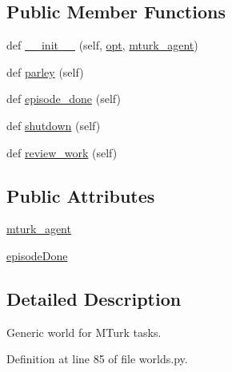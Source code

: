 \subsection*{Public Member Functions}
\begin{DoxyCompactItemize}
\item 
def \hyperlink{classparlai_1_1mturk_1_1core_1_1worlds_1_1MTurkTaskWorld_a7aee41b0411b618882dbad31b8c6209a}{\+\_\+\+\_\+init\+\_\+\+\_\+} (self, \hyperlink{classparlai_1_1core_1_1worlds_1_1World_a3640d92718acd3e6942a28c1ab3678bd}{opt}, \hyperlink{classparlai_1_1mturk_1_1core_1_1worlds_1_1MTurkTaskWorld_ae9fb1250e0b9a2f77efa255458e47fb3}{mturk\+\_\+agent})
\item 
def \hyperlink{classparlai_1_1mturk_1_1core_1_1worlds_1_1MTurkTaskWorld_aafb537fad9c12b4371599b0559d37c42}{parley} (self)
\item 
def \hyperlink{classparlai_1_1mturk_1_1core_1_1worlds_1_1MTurkTaskWorld_a9199b698134e0b6e83951ef10b9b25be}{episode\+\_\+done} (self)
\item 
def \hyperlink{classparlai_1_1mturk_1_1core_1_1worlds_1_1MTurkTaskWorld_a4c084c5ba931d4c241fc6f4046a8c5e8}{shutdown} (self)
\item 
def \hyperlink{classparlai_1_1mturk_1_1core_1_1worlds_1_1MTurkTaskWorld_ac601ef19c221a1ec43ecbaa322ff67a4}{review\+\_\+work} (self)
\end{DoxyCompactItemize}
\subsection*{Public Attributes}
\begin{DoxyCompactItemize}
\item 
\hyperlink{classparlai_1_1mturk_1_1core_1_1worlds_1_1MTurkTaskWorld_ae9fb1250e0b9a2f77efa255458e47fb3}{mturk\+\_\+agent}
\item 
\hyperlink{classparlai_1_1mturk_1_1core_1_1worlds_1_1MTurkTaskWorld_ab54f79ffe393a5c0bb185f61e5809522}{episode\+Done}
\end{DoxyCompactItemize}


\subsection{Detailed Description}
\begin{DoxyVerb}Generic world for MTurk tasks.
\end{DoxyVerb}
 

Definition at line 85 of file worlds.\+py.




